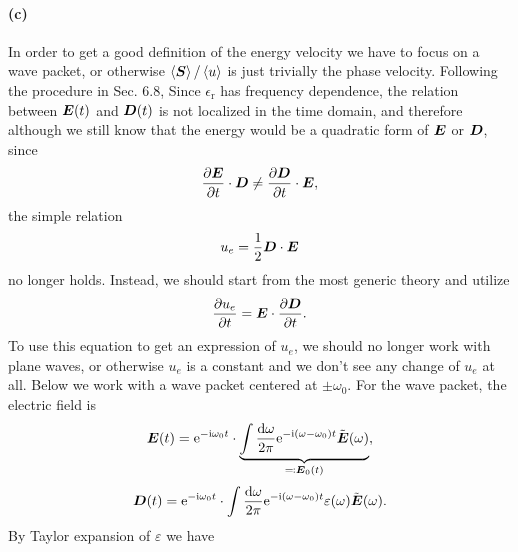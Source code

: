 \documentclass[hyperref, a4paper]{article}
\newcommand*{\ii}{\mathrm{i}}
\newcommand*{\ee}{\mathrm{e}}
\newcommand{\epsr}{\epsilon_{\text{r}}}
\newcommand{\Efreq}{\tilde{\vb*{E}}}
\begin{document}
\paragraph{(c)} In order to get a good definition of 
the energy velocity we have to focus on a wave packet, 
or otherwise $\expval{\vb*{S}} / \expval{u}$ is just 
trivially the phase velocity.
Following the procedure in \cite{jackson1999classical} Sec. 6.8,
Since $\epsr$ has frequency dependence,
the relation between $\vb*{E}(t)$ and $\vb*{D}(t)$ 
is not localized in the time domain,
and therefore although we still know that 
the energy would be a quadratic form of $\vb*{E}$ or $\vb*{D}$,
since 
\begin{equation}
    \pdv{\vb*{E}}{t} \cdot \vb*{D} \neq \pdv{\vb*{D}}{t} \cdot \vb*{E},
\end{equation}
the simple relation 
\[
    u_e = \frac{1}{2} \vb*{D} \cdot \vb*{E} 
\]
no longer holds.
Instead, we should start from the most generic theory 
and utilize 
\begin{equation}
    \pdv{u_e}{t} = \vb*{E} \cdot \pdv{\vb*{D}}{t}.
    \label{eq:change-of-ue}
\end{equation} 
To use this equation to get an expression of $u_e$,
we should no longer work with plane waves, 
or otherwise $u_e$ is a constant and 
we don't see any change of $u_e$ at all.
Below we work with a wave packet centered at $\pm \omega_0$.
For the wave packet, the electric field is 
\begin{equation}
    \vb*{E}(t) = \ee^{- \ii \omega_0 t} \cdot 
        \underbrace{
            \int \frac{\dd{\omega}}{2\pi} \ee^{- \ii (\omega - \omega_0) t}
            \Efreq(\omega)
        }_{\eqqcolon \vb*{E}_0(t)},
\end{equation}
\begin{equation}
    \vb*{D}(t) = \ee^{- \ii \omega_0 t} \cdot 
        \int \frac{\dd{\omega}}{2\pi} \ee^{- \ii (\omega - \omega_0) t}
            \varepsilon(\omega) \Efreq(\omega) .
\end{equation}
By Taylor expansion of $\varepsilon$ we have 
\end{document}
